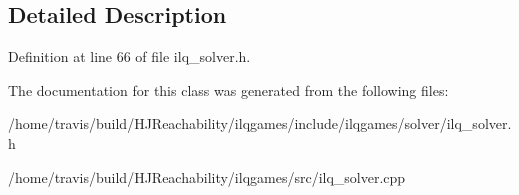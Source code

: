 \subsection{Detailed Description}


Definition at line 66 of file ilq\+\_\+solver.\+h.



The documentation for this class was generated from the following files\+:\begin{DoxyCompactItemize}
\item 
/home/travis/build/\+H\+J\+Reachability/ilqgames/include/ilqgames/solver/ilq\+\_\+solver.\+h\item 
/home/travis/build/\+H\+J\+Reachability/ilqgames/src/ilq\+\_\+solver.\+cpp\end{DoxyCompactItemize}
